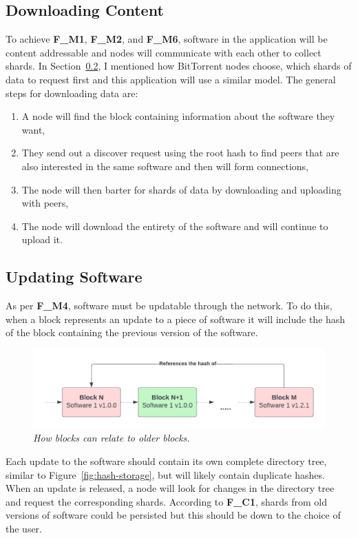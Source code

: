 \subsection{Downloading Content}

To achieve \textbf{F\_M1}, \textbf{F\_M2}, and \textbf{F\_M6}, software in the application will be content addressable and nodes will communicate with each other to collect shards. In Section~\ref{}, I mentioned how BitTorrent nodes choose, which shards of data to request first and this application will use a similar model. The general steps for downloading data are:

\begin{enumerate}
  \item A node will find the block containing information about the software they want,
  \item They send out a discover request using the root hash to find peers that are also interested in the same software and then will form connections,
  \item The node will then barter for shards of data by downloading and uploading with peers,
  \item The node will download the entirety of the software and will continue to upload it.
\end{enumerate}

\subsection{Updating Software}

As per \textbf{F\_M4}, software must be updatable through the network. To do this, when a block represents an update to a piece of software it will include the hash of the block containing the previous version of the software.

\begin{figure}[ht]
  \centering
  \includegraphics[width=.85\textwidth]{diagrams/update-software.png}
  \caption{\textit{How blocks can relate to older blocks.}}
\end{figure}

Each update to the software should contain its own complete directory tree, similar to Figure~\ref{fig:hash-storage}, but will likely contain duplicate hashes. When an update is released, a node will look for changes in the directory tree and request the corresponding shards. According to \textbf{F\_C1}, shards from old versions of software could be persisted but this should be down to the choice of the user.